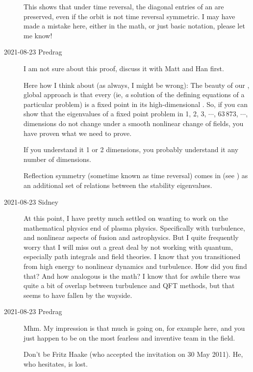 \begin{description}
This shows that under time reversal, the diagonal entries of an
{\jacobianOrb} are preserved, even if the orbit is not time reversal
symmetric. I may have made a mistake here, either in the math, or just
basic notation, please let me know!

\item[2021-08-23 Predrag]
I am not sure about this proof, discuss it with Matt and Han first.

Here how I think about (as always, I might be wrong):
The beauty of our \spt, global approach is that every {\lattstate} (ie,
{\em a} solution of the defining equations of a particular problem) is a
fixed point in its high-dimensional \statesp. So, if you can show that
the eigenvalues of a fixed point problem in 1, 2, 3, $\cdots$, 63\,873,
$\cdots$, dimensions do not change under a smooth nonlinear change of
fields, you have proven what we need to prove.

If you understand it 1 or 2 dimensions, you probably understand it any
number of dimensions.

Reflection symmetry (sometime known as time reversal) comes in
(see )
 as an additional set of relations between the stability eigenvalues.

\item[2021-08-23 Sidney]
At this point, I have pretty much settled on wanting to work on the
mathematical physics end of plasma physics. Specifically with turbulence,
and nonlinear aspects of fusion and astrophysics. But I quite frequently
worry that I will miss out a great deal by not working with quantum,
especially path integrals and field theories. I know that you
transitioned from high energy to nonlinear dynamics and turbulence. How
did you find that? And how analogous is the math? I know that for awhile
there was quite a bit of overlap between turbulence and QFT methods, but
that seems to have fallen by the wayside.

\item[2021-08-23 Predrag]
Mhm. My impression is that
{much is going on}, for example
 {here}, and you just
happen to be on the most fearless and inventive team in the field.

Don't be
{Fritz Haake} (who accepted the invitation on 30 May 2011).
He, who hesitates, is lost.


\end{description}
